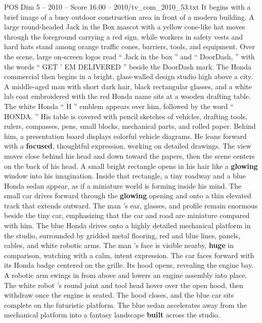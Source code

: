 \begin{textsample}{POS Dim 5 – 2010 – Score 16.00 – 2010/tv\_com\_2010\_53.txt}  \label{ex:f5_pos_041}
It begins with a brief image of a busy outdoor construction area in front of a modern building.
A large round-headed Jack in the Box mascot with a yellow cone-like hat moves through the foreground carrying a red sign, while workers in safety vests and hard hats stand among orange traffic cones, barriers, tools, and equipment.
Over the scene, large on-screen logos read “ Jack in the box ” and “ DoorDash, ” with the words “ GET ’ EM DELIVERED ” beside the DoorDash mark.
The Honda commercial then begins in a bright, glass-walled design studio high above a city.
A middle-aged man with short dark hair, black rectangular glasses, and a white lab coat embroidered with the red Honda name sits at a wooden drafting table.
The white Honda “ H ” emblem appears over him, followed by the word “ HONDA. ” His table is covered with pencil sketches of vehicles, drafting tools, rulers, compasses, pens, small blocks, mechanical parts, and rolled paper.
Behind him, a presentation board displays colorful vehicle diagrams.
He leans forward with a \textbf{focused}, thoughtful expression, working on detailed drawings.
The view moves close behind his head and down toward the papers, then the scene centers on the back of his head.
A small bright rectangle opens in his hair like a \textbf{glowing} window into his imagination.
Inside that rectangle, a tiny roadway and a blue Honda sedan appear, as if a miniature world is forming inside his mind.
The small car drives forward through the \textbf{glowing} opening and onto a thin elevated track that extends outward.
The man ’s ear, glasses, and profile remain enormous beside the tiny car, emphasizing that the car and road are miniature compared with him.
The blue Honda drives onto a highly detailed mechanical platform in the studio, surrounded by gridded metal flooring, red and blue lines, panels, cables, and white robotic arms.
The man ’s face is visible nearby, \textbf{huge} in comparison, watching with a calm, intent expression.
The car faces forward with its Honda badge centered on the grille.
Its hood opens, revealing the engine bay.
A robotic arm swings in from above and lowers an engine assembly into place.
The white robot ’s round joint and tool head hover over the open hood, then withdraw once the engine is seated.
The hood closes, and the blue car sits complete on the futuristic platform.
The blue sedan accelerates away from the mechanical platform into a fantasy landscape \textbf{built} across the studio.

\end{textsample}
